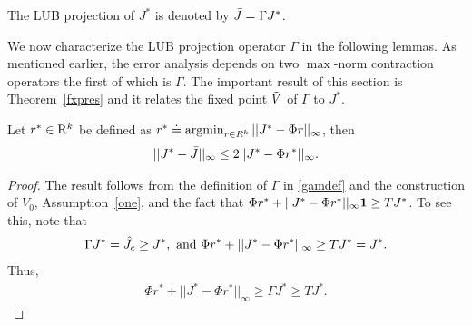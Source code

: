 \begin{definition}\label{bestproj}
The LUB projection of $J^*$ is denoted by $\bar{J}=\Gamma J^*$.
\end{definition}
We now characterize the LUB projection operator $\Gamma$ in the following lemmas. 
As mentioned earlier, the error analysis depends on two $\max$-norm contraction operators the first of which is $\Gamma$. The important result of this section is Theorem~\ref{fxpres} and it relates the fixed point $\tilde{V}$ of $\Gamma$ to $J^*$.
\begin{lemma}\label{bestbnd}
Let $r^*\in \mathrm{R}^k$ be defined as $r^*\doteq\operatorname{argmin}_{r\in R^k}||J^*-\Phi r||_\infty$, then 
\begin{align}
||J^*-\bar{J}||_\infty\leq 2||J^*-\Phi r^*||_\infty.
\end{align}
\end{lemma}
\begin{proof}
The result follows from the definition of $\Gamma$ in \eqref{gamdef} and the construction of $V_0$, Assumption~\ref{one}, and the fact that $\Phi r^*+||J^*-\Phi r^*||_\infty \mathbf{1}\geq TJ^*$. To see this, note that
\begin{align}
\Gamma J^*=\hat{J}_c \geq J^*,\nonumber \text{ and }
\Phi r^* +||J^*-\Phi r^*||_\infty\geq TJ^*= J^*.\nonumber
\end{align}
Thus,
\begin{align}
\Phi r^* +||J^*-\Phi r^*||_\infty\geq \Gamma J^*\geq TJ^*.
\end{align}
\end{proof}

